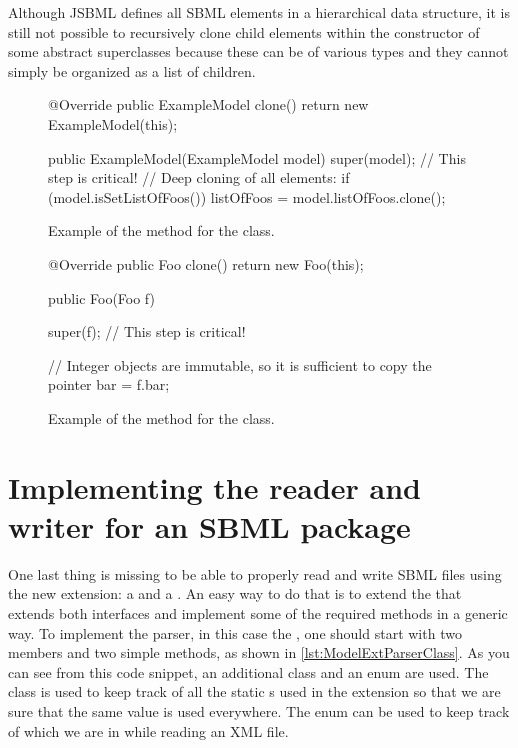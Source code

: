 Although JSBML defines all SBML elements in a hierarchical data structure, it
is still not possible to recursively clone child elements within the
constructor of some abstract superclasses because these can be of various
types and they cannot simply be organized as a list of children.

\begin{figure}[htb]
  \begin{example}[numbers=left]
@Override public ExampleModel clone() {
  return new ExampleModel(this);
}

public ExampleModel(ExampleModel model) {
  super(model);  // This step is critical!
  // Deep cloning of all elements:
  if (model.isSetListOfFoos()) {
    listOfFoos = model.listOfFoos.clone();
  }
}\end{example}
 \caption{Example of the  method for the  class.}
 \label{lst:ModelExtClone}
\end{figure}

\begin{figure}[htb]
  \begin{example}[numbers=left]
@Override public Foo clone() {
  return new Foo(this);
}

public Foo(Foo f) {
  super(f);  // This step is critical!

  // Integer objects are immutable, so it is sufficient to copy the pointer
  bar = f.bar;
}\end{example}
  \caption{Example of the  method for the  class.}
  \label{lst:ModelExtCloneFoo}
\end{figure}


\section{Implementing the reader and writer for an SBML package}

One last thing is missing to be able to properly read and write SBML files
using the new extension: a  and a . An easy way to do that is
to extend the \AbstractReaderWriter that extends both interfaces and implement some of 
the required methods in a generic way. To
implement the parser, in this case the , one should
start with two members and two simple methods, as shown in
\vref{lst:ModelExtParserClass}. As you can see from this code snippet, an additional class
 and an enum  are used. The class 
is used to keep track of all the static \String{}s used in the extension so that we are sure 
that the same value is used everywhere. The enum   can be used to keep
track of which  we are in while reading an XML file.

